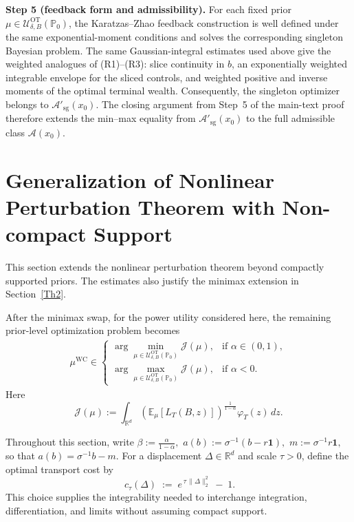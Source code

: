 \documentclass[11pt]{article}
\theoremstyle{definition}
\begin{document}
\medskip\noindent
\textbf{Step 5 (feedback form and admissibility).}
{
For each fixed prior
$\mu\in\mathcal U_{\delta,B}^{\mathrm{OT}}(\mathbb P_0)$, the
Karatzas--Zhao feedback construction is well defined under the same
exponential-moment conditions and solves the corresponding singleton
Bayesian problem. The same Gaussian-integral estimates used above give
the weighted analogues of (R1)--(R3): slice continuity in $b$, an
exponentially weighted integrable envelope for the sliced controls, and
weighted positive and inverse moments of the optimal terminal wealth.
Consequently, the singleton optimizer belongs to
$\mathcal A'_{\mathrm{sg}}(x_0)$. The closing argument from Step~5 of
the main-text proof therefore extends the min--max equality from
$\mathcal A'_{\mathrm{sg}}(x_0)$ to the full admissible class
$\mathcal A(x_0)$.
}
\section{Generalization of Nonlinear Perturbation Theorem with Non-compact Support}\label{Th3}
{This section extends the nonlinear perturbation theorem beyond compactly
supported priors. The estimates also justify the minimax extension in
Section~\ref{Th2}.}

After the minimax swap, for the power utility considered here, the
remaining prior-level optimization problem becomes
\begin{align}\label{FWProblem1}
\mu^{\mathrm{WC}} \in
\begin{cases}
\displaystyle
\arg\min_{\mu\in
\mathcal U_{\delta,B}^{\mathrm{OT}}(\mathbb P_0)}
\mathcal J(\mu),
& \text{if } \alpha\in(0,1),\\[2mm]
\displaystyle
\arg\max_{\mu\in
\mathcal U_{\delta,B}^{\mathrm{OT}}(\mathbb P_0)}
\mathcal J(\mu),
& \text{if } \alpha<0.
\end{cases}
\end{align}
Here
\[
\mathcal J(\mu)
:=
\int_{\mathbb R^d}
\left(
\mathbb E_{\mu}[L_T(B,z)]
\right)^{\frac{1}{1-\alpha}}
\varphi_T(z)\,dz.
\]

Throughout this section, write $\beta:=\frac{\alpha}{1-\alpha},$ $a(b):=\sigma^{-1}(b-r\mathbf 1),$ $m:=\sigma^{-1}r\mathbf 1,$ so that $a(b)=\sigma^{-1}b-m.$
{For a displacement $\Delta\in\mathbb R^d$ and scale $\tau>0$, define the
optimal transport cost by}
\[
\ c_\tau(\Delta)\;:=\;e^{\,\tau\,\|\Delta\|_2^2}\;-\;1.
\]
{This choice supplies the integrability needed to interchange integration,
differentiation, and limits without assuming compact support.}
\end{document}
